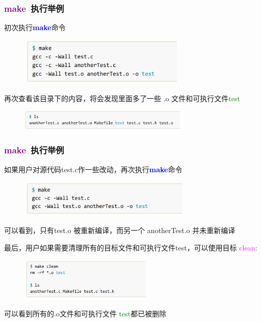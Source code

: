 \frame
{
	\frametitle{\textcolor{purple}{\textbf{make}}~执行举例}
	初次执行\textcolor{blue}{\textbf{make}}命令
\begin{figure}[h!]
	\vskip -3pt
\centering
\includegraphics[height=0.9in,clip]{Figures/Make_Makefile_3.png}
\label{Fig:Make_Makefile_3}
\end{figure}
再次查看该目录下的内容，将会发现里面多了一些 \textrm{.o} 文件和可执行文件\textcolor{green}{\textrm{test}}
\begin{figure}[h!]
	\vskip -3pt
\centering
\includegraphics[height=0.4in,clip]{Figures/Make_Makefile_4.png}
\label{Fig:Make_Makefile_4}
\end{figure}
}

\frame
{
	\frametitle{\textcolor{purple}{\textbf{make}}~执行举例}
	如果用户对源代码\textrm{test.c}作一些改动，再次执行\textcolor{blue}{\textbf{make}}命令
\begin{figure}[h!]
	\vskip -3pt
\centering
\includegraphics[height=0.7in,clip]{Figures/Make_Makefile_5.png}
\label{Fig:Make_Makefile_5}
\end{figure}
可以看到，只有\textrm{test.o} 被重新编译，而另一个 \textrm{anotherTest.o} 并未重新编译

最后，用户如果需要清理所有的目标文件和可执行文件\textrm{test}，可以使用目标 \textcolor{magenta}{\textrm{clean}}:
\begin{figure}[h!]
	\vskip -4pt
\centering
\includegraphics[height=0.8in,clip]{Figures/Make_Makefile_6.png}
\label{Fig:Make_Makefile_6}
\end{figure}
可以看到所有的\textrm{.o}文件和可执行文件 \textcolor{green}{\textrm{test}}都已被删除
}

